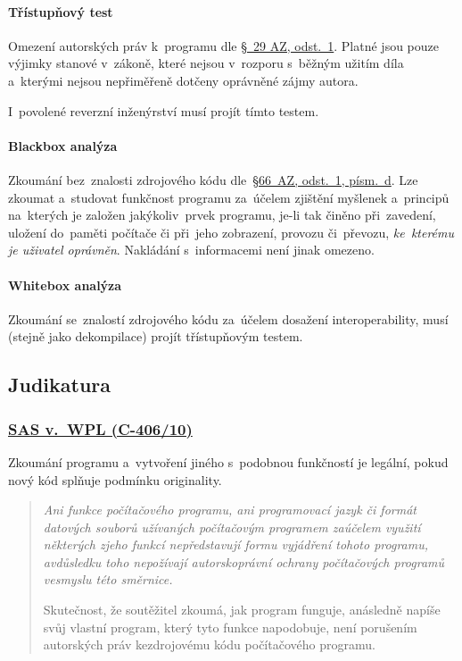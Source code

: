 \paragraph{Třístupňový test} Omezení autorských práv k~programu dle \href{https://www.zakonyprolidi.cz/cs/2000-121#p66-6}{§~29 AZ, odst.~1}. Platné jsou pouze výjimky stanové v~zákoně, které nejsou v~rozporu s~běžným užitím díla a~kterými nejsou nepřiměřeně dotčeny oprávněné zájmy autora.

I~povolené reverzní inženýrství musí projít tímto testem.

\paragraph{Blackbox analýza} Zkoumání bez~znalosti zdrojového kódu dle~{\href{https://www.zakonyprolidi.cz/cs/2000-121#p66-1-d}{§66~AZ, odst.~1, písm.~d}}. Lze zkoumat a~studovat funkčnost programu za~účelem zjištění myšlenek a~principů na~kterých je založen jakýkoliv~prvek programu, je-li tak činěno při~zavedení, uložení do~paměti počítače či při~jeho zobrazení, provozu či~převozu, \emph{ke~kterému je uživatel oprávněn}. Nakládání s~informacemi není jinak omezeno.

\paragraph{Whitebox analýza} Zkoumání se~znalostí zdrojového kódu za~účelem dosažení interoperability, musí (stejně jako dekompilace) projít třístupňovým testem.

\subsection{Judikatura}

\subsubsection{\href{https://curia.europa.eu/juris/liste.jsf?num=C-406\%2F10}{SAS v.~WPL (C-406/10)}}

Zkoumání programu a~vytvoření jiného s~podobnou funkčností je legální, pokud nový kód splňuje podmínku originality.

\blockquote{
\itshape
Ani funkce počítačového programu, ani programovací jazyk či formát datových souborů užívaných počítačovým programem zaúčelem využití některých zjeho funkcí nepředstavují formu vyjádření tohoto programu, avdůsledku toho nepožívají autorskoprávní ochrany počítačových programů vesmyslu této směrnice.

Skutečnost, že soutěžitel zkoumá, jak program funguje, anásledně napíše svůj vlastní program, který tyto funkce napodobuje, není porušením autorských práv kezdrojovému kódu počítačového programu.}

